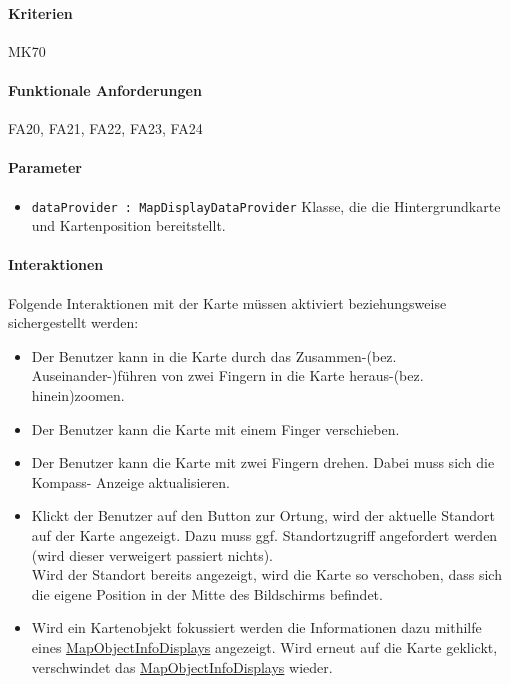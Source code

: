 \paragraph{Kriterien}
MK70
\paragraph{Funktionale Anforderungen}
FA20, FA21, FA22, FA23, FA24

\paragraph*{Parameter}
\begin{itemize}
    \item \texttt{dataProvider : MapDisplayDataProvider} Klasse, die die Hintergrundkarte und Kartenposition bereitstellt.
\end{itemize}

\paragraph*{Interaktionen}
Folgende Interaktionen mit der Karte müssen aktiviert beziehungsweise sichergestellt werden:
\begin{itemize}
    \item Der Benutzer kann in die Karte durch das Zusammen-(bez. Auseinander-)führen von zwei 
    Fingern in die Karte heraus-(bez. hinein)zoomen.
    \item Der Benutzer kann die Karte mit einem Finger verschieben.
    \item Der Benutzer kann die Karte mit zwei Fingern drehen. Dabei muss sich die Kompass-
    Anzeige aktualisieren.
    \item Klickt der Benutzer auf den Button zur Ortung, wird der aktuelle Standort auf der Karte 
    angezeigt. Dazu muss ggf. Standortzugriff angefordert werden (wird dieser verweigert passiert 
    nichts).\\
    Wird der Standort bereits angezeigt, wird die Karte so verschoben, dass sich die eigene Position 
    in der Mitte des Bildschirms befindet. \\
    \item Wird ein Kartenobjekt fokussiert werden die Informationen dazu mithilfe eines \hyperref[App_Map_View_MapObjectInfoDisplay]{MapObjectInfoDisplays} angezeigt. 
    Wird erneut auf die Karte geklickt, verschwindet das \hyperref[App_Map_View_MapObjectInfoDisplay]{MapObjectInfoDisplays} wieder.

\end{itemize}
